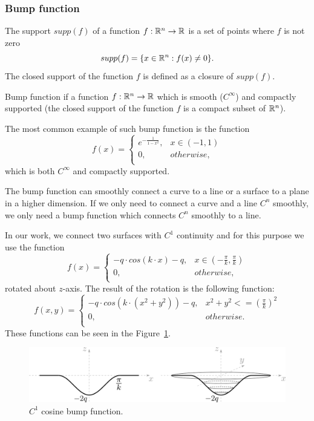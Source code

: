 \subsubsection*{Bump function}
\begin{definition}
The support $supp(f)$ of a function $f: \mathbb{R}^n \to \mathbb{R}$ is a set of points where $f$ is not
zero $$supp(f) = \{ x\in \mathbb{R}^n : f(x)\neq 0 \}.$$
The closed support of the function $f$ is defined as a closure of $supp(f)$.
\end{definition}
Bump function if a function $f:\mathbb{R}^n \to \mathbb{R}$ which is smooth ($C^\infty$) and
compactly supported (the closed support of the function $f$ is a compact subset
of $\mathbb{R}^n$).

The most common example of such bump function is the function 
$$f(x)= \left\{
    \begin{array}{ll}
        e^{-\frac{1}{1-x^2}}, & x \in (-1, 1) \\
          0, & otherwise,\\
    \end{array} 
    \right. $$
which is both $C^\infty$ and compactly supported.

The bump function can smoothly connect a curve to a line or a surface to a
plane in a higher dimension. If we only need to connect a curve and a line $C^n$ smoothly, 
we only need a bump function which connects $C^n$ smoothly to a line.

In our work, we connect two surfaces with $C^1$ continuity and for this purpose
we use the function
$$f(x)= \left\{
    \begin{array}{ll}
        -q \cdot cos(k \cdot x)-q, & x \in (-\frac{\pi}{k}, \frac{\pi}{k}) \\
        0, & otherwise,\\
    \end{array} 
    \right. $$
rotated about $z$-axis.
The result of the rotation is the following function:
$$f(x, y) = \left\{
    \begin{array}{ll}
        -q \cdot cos(k \cdot (x^2+y^2))-q, & x^2+y^2<=(\frac{\pi}{k})^2 \\
        0, & otherwise.\\
    \end{array} 
    \right. $$
These functions can be seen in the Figure~\ref{img:21}.
\begin{figure}
    \centerline{\includegraphics[scale=0.5]{images/img21}}
    \caption[$C^1$ cosine bump function.]
    {$C^1$ cosine bump function.}
    \label{img:21}
\end{figure}

